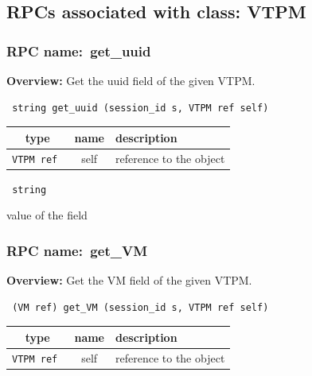 \subsection{RPCs associated with class: VTPM}
\subsubsection{RPC name:~get\_uuid}

{\bf Overview:} 
Get the uuid field of the given VTPM.

\begin{verbatim} string get_uuid (session_id s, VTPM ref self)\end{verbatim}



 
\vspace{0.3cm}
\begin{tabular}{|c|c|p{7cm}|}
 \hline
{\bf type} & {\bf name} & {\bf description} \\ \hline
{\tt VTPM ref } & self & reference to the object \\ \hline 

\end{tabular}

\vspace{0.3cm}

{\tt 
string
}


value of the field
\vspace{0.3cm}
\vspace{0.3cm}
\vspace{0.3cm}
\subsubsection{RPC name:~get\_VM}

{\bf Overview:} 
Get the VM field of the given VTPM.

\begin{verbatim} (VM ref) get_VM (session_id s, VTPM ref self)\end{verbatim}



 
\vspace{0.3cm}
\begin{tabular}{|c|c|p{7cm}|}
 \hline
{\bf type} & {\bf name} & {\bf description} \\ \hline
{\tt VTPM ref } & self & reference to the object \\ \hline 

\end{tabular}

